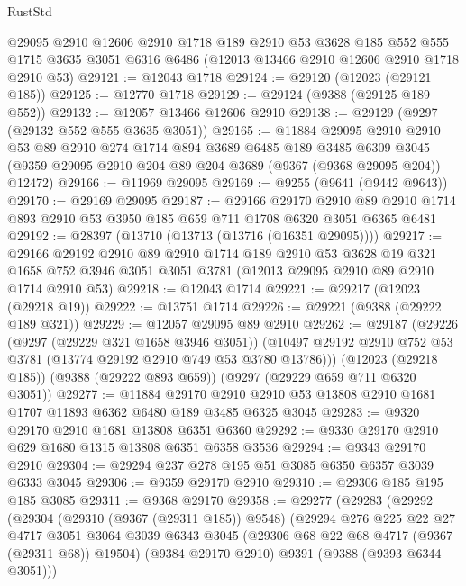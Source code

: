 \begin{lexlean}{RustStd}
\begin{coremodule}
    @29095
    @2910
    @12606
    @2910
    @1718
    @189
    @2910
    @53
    @3628
    @185
    @552
    @555
    @1715
    @3635
    @3051
    @6316
    @6486
    (@12013 @13466 @2910 @12606 @2910 @1718 @2910 @53)
@29121 := @12043 @1718
@29124 := @29120 (@12023 (@29121 @185))
@29125 := @12770 @1718
@29129 := @29124 (@9388 (@29125 @189 @552))
@29132 := @12057 @13466 @12606 @2910
@29138 := @29129 (@9297 (@29132 @552 @555 @3635 @3051))
@29165 := @11884
    @29095
    @2910
    @2910
    @53
    @89
    @2910
    @274
    @1714
    @894
    @3689
    @6485
    @189
    @3485
    @6309
    @3045
    (@9359 @29095 @2910 @204 @89 @204 @3689 (@9367 (@9368 @29095 @204)) @12472)
@29166 := @11969 @29095
@29169 := @9255 (@9641 (@9442 @9643))
@29170 := @29169 @29095
@29187 := @29166
    @29170
    @2910
    @89
    @2910
    @1714
    @893
    @2910
    @53
    @3950
    @185
    @659
    @711
    @1708
    @6320
    @3051
    @6365
    @6481
@29192 := @28397 (@13710 (@13713 (@13716 (@16351 @29095))))
@29217 := @29166
    @29192
    @2910
    @89
    @2910
    @1714
    @189
    @2910
    @53
    @3628
    @19
    @321
    @1658
    @752
    @3946
    @3051
    @3051
    @3781
    (@12013 @29095 @2910 @89 @2910 @1714 @2910 @53)
@29218 := @12043 @1714
@29221 := @29217 (@12023 (@29218 @19))
@29222 := @13751 @1714
@29226 := @29221 (@9388 (@29222 @189 @321))
@29229 := @12057 @29095 @89 @2910
@29262 := @29187
    (@29226
      (@9297 (@29229 @321 @1658 @3946 @3051))
      (@10497 @29192 @2910 @752 @53 @3781 (@13774 @29192 @2910 @749 @53 @3780 @13786)))
    (@12023 (@29218 @185))
    (@9388 (@29222 @893 @659))
    (@9297 (@29229 @659 @711 @6320 @3051))
@29277 := @11884
    @29170
    @2910
    @2910
    @53
    @13808
    @2910
    @1681
    @1707
    @11893
    @6362
    @6480
    @189
    @3485
    @6325
    @3045
@29283 := @9320 @29170 @2910 @1681 @13808 @6351 @6360
@29292 := @9330 @29170 @2910 @629 @1680 @1315 @13808 @6351 @6358 @3536
@29294 := @9343 @29170 @2910
@29304 := @29294 @237 @278 @195 @51 @3085 @6350 @6357 @3039 @6333 @3045
@29306 := @9359 @29170 @2910
@29310 := @29306 @185 @195 @185 @3085
@29311 := @9368 @29170
@29358 := @29277
    (@29283
      (@29292
        (@29304
          (@29310 (@9367 (@29311 @185)) @9548)
          (@29294
            @276
            @225
            @22
            @27
            @4717
            @3051
            @3064
            @3039
            @6343
            @3045
            (@29306 @68 @22 @68 @4717 (@9367 (@29311 @68)) @19504)
            (@9384 @29170 @2910)
            @9391
            (@9388 (@9393 @6344 @3051)))

\end{coremodule}
\end{lexlean}
